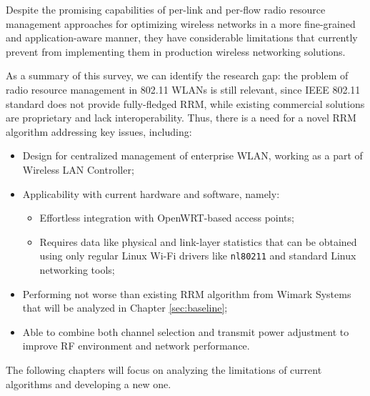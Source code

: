 Despite the promising capabilities of per-link and per-flow radio resource management approaches for optimizing wireless networks in a more fine-grained and application-aware manner, they have considerable limitations that currently prevent from implementing them in production wireless networking solutions.

As a summary of this survey, we can identify the research gap: the problem of radio resource management in 802.11 WLANs is still relevant, since IEEE 802.11 standard does not provide fully-fledged RRM, while existing commercial solutions are proprietary and lack interoperability. Thus, there is a need for a novel RRM algorithm addressing key issues, including:
\begin{itemize}
    \item Design for centralized management of enterprise WLAN, working as a part of Wireless LAN Controller;
    \item Applicability with current hardware and software, namely:
    \begin{itemize}
        \item Effortless integration with OpenWRT-based access points;
        \item Requires data like physical and link-layer statistics that can be obtained using only regular Linux Wi-Fi drivers like \texttt{nl80211} and standard Linux networking tools;
    \end{itemize}
    \item Performing not worse than existing RRM algorithm from Wimark Systems that will be analyzed in Chapter \ref{sec:baseline};
    \item Able to combine both channel selection and transmit power adjustment to improve RF environment and network performance.
\end{itemize}

The following chapters will focus on analyzing the limitations of current algorithms and developing a new one.